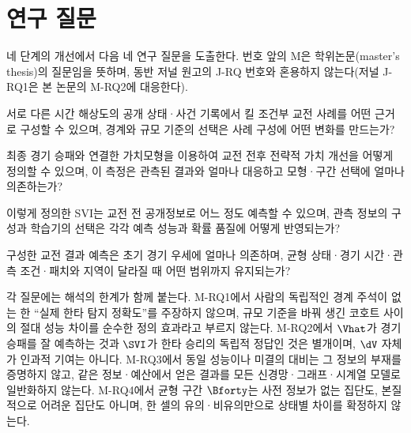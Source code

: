 \section{연구 질문}
\label{sec:intro-rq}

네 단계의 개선에서 다음 네 연구 질문을 도출한다. 번호 앞의 M은 학위논문(master's thesis)의 질문임을 뜻하며, 동반 저널 원고의 J-RQ 번호와 혼용하지 않는다(저널 J-RQ1은 본 논문의 M-RQ2에 대응한다).

\begin{description}[leftmargin=3.6em,style=nextline]
  \item[M-RQ1 (교전 사례 구성, I1)] 서로 다른 시간 해상도의 공개 상태·사건 기록에서 킬 조건부 교전 사례를 어떤 근거로 구성할 수 있으며, 경계와 규모 기준의 선택은 사례 구성에 어떤 변화를 만드는가?
  \item[M-RQ2 (결과 가치 구성, I2)] 최종 경기 승패와 연결한 가치모형을 이용하여 교전 전후 전략적 가치 개선을 어떻게 정의할 수 있으며, 이 측정은 관측된 결과와 얼마나 대응하고 모형·구간 선택에 얼마나 의존하는가?
  \item[M-RQ3 (사전 정보와 학습기, I3)] 이렇게 정의한 SVI는 교전 전 공개정보로 어느 정도 예측할 수 있으며, 관측 정보의 구성과 학습기의 선택은 각각 예측 성능과 확률 품질에 어떻게 반영되는가?
  \item[M-RQ4 (예측의 의미와 적용 범위, I4)] 구성한 교전 결과 예측은 초기 경기 우세에 얼마나 의존하며, 균형 상태·경기 시간·관측 조건·패치와 지역이 달라질 때 어떤 범위까지 유지되는가?
\end{description}

각 질문에는 해석의 한계가 함께 붙는다. M-RQ1에서 사람의 독립적인 경계 주석이 없는 한 ``실제 한타 탐지 정확도''를 주장하지 않으며, 규모 기준을 바꿔 생긴 코호트 사이의 절대 성능 차이를 순수한 정의 효과라고 부르지 않는다. M-RQ2에서 $\Vhat$가 경기 승패를 잘 예측하는 것과 $\SVI$가 한타 승리의 독립적 정답인 것은 별개이며, $\dV$ 자체가 인과적 기여는 아니다. M-RQ3에서 동일 성능이나 미결의 대비는 그 정보의 부재를 증명하지 않고, 같은 정보·예산에서 얻은 결과를 모든 신경망·그래프·시계열 모델로 일반화하지 않는다. M-RQ4에서 균형 구간 $\Bforty$는 사전 정보가 없는 집단도, 본질적으로 어려운 집단도 아니며, 한 셀의 유의·비유의만으로 상태별 차이를 확정하지 않는다.

